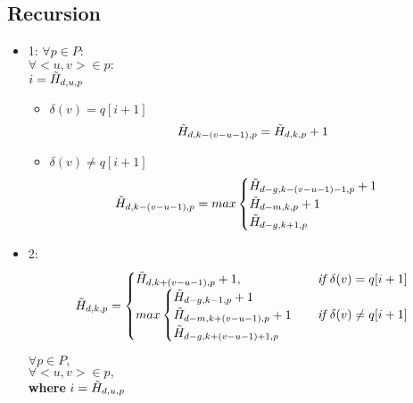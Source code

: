 \documentclass{article}
\begin{document}
\subsection{Recursion}
\begin{itemize}
    \item 1: 
    $\forall p \in P: $ \\
    $\forall <u, v> \in p:$ \\
     $ i = \Tilde{H}_{d, u, p}$ 
    
    \begin{itemize}
        \item $\delta(v) = q[i+1]$
            \begin{equation}
                \Tilde{H}_{d,k - (v-u-1), p} = \Tilde{H}_{d,k,p} + 1
            \end{equation}
            
        \item $\delta(v) \neq q[i+1]$
            \begin{equation}
                \Tilde{H}_{d,k - (v-u-1), p} = max \begin{cases}
                    \Tilde{H}_{d-g, k - (v-u-1) - 1, p} + 1\\
                    \Tilde{H}_{d-m, k, p} + 1 \\
                    \Tilde{H}_{d-g, k + 1, p}
                \end{cases}
            \end{equation}
    \end{itemize}

    \item 2: 
    \begin{equation}
        \Tilde{H}_{d,k,p} = \begin{cases}
             \Tilde{H}_{d,k+(v-u-1),p} + 1, & \textit{if } \delta(v) = q[i+1] \\
             max \begin{cases}
                \Tilde{H}_{d-g, k-1, p} + 1\\
                \Tilde{H}_{d-m, k + (v-u-1), p} + 1\\
                \Tilde{H}_{d-g, k + (v-u-1) + 1, p}
            \end{cases} & \textit{if } \delta(v) \neq q[i + 1]
        \end{cases}
    \end{equation}

    $\forall p \in P,$ \\ 
    $\forall <u,v> \in p,$ \\
    \textbf{where} $i = \Tilde{H}_{d,u,p}$
    
\end{itemize}
\end{document}

